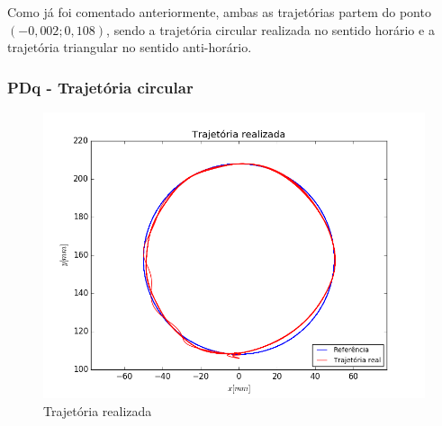 \documentclass[]{politex}
\begin{document}
Como já foi comentado anteriormente, ambas as trajetórias partem do ponto $(-0{,}002; 0{,}108)$, sendo a trajetória circular realizada no sentido horário e a trajetória triangular no sentido anti-horário.

\newpage

\subsubsection{PDq - Trajetória circular}

\begin{figure}[H]
	\centering
	\includegraphics[scale=0.39]{../../../Experimental/Aquisicoes/PIDt_circulo/xy.png}  
	\caption{Trajetória realizada}
	\label{fig:PIDq_circulo_xy}
\end{figure}
\end{document}
